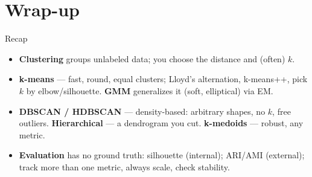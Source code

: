 \documentclass[aspectratio=169]{beamer}
\begin{document}
\section*{Wrap-up}

\begin{frame}{Recap}
  \begin{itemize}\small
    \item \textbf{Clustering} groups unlabeled data; you choose the distance and (often) $k$.
    \item \textbf{k-means} --- fast, round, equal clusters; Lloyd's alternation, k-means++,
      pick $k$ by elbow/silhouette. \textbf{GMM} generalizes it (soft, elliptical) via EM.
    \item \textbf{DBSCAN / HDBSCAN} --- density-based: arbitrary shapes, no $k$, free outliers.
      \textbf{Hierarchical} --- a dendrogram you cut. \textbf{k-medoids} --- robust, any metric.
    \item \textbf{Evaluation} has no ground truth: silhouette (internal); ARI/AMI (external);
      track more than one metric, always scale, check stability.
  \end{itemize}
  \vfill
\end{frame}
\end{document}
